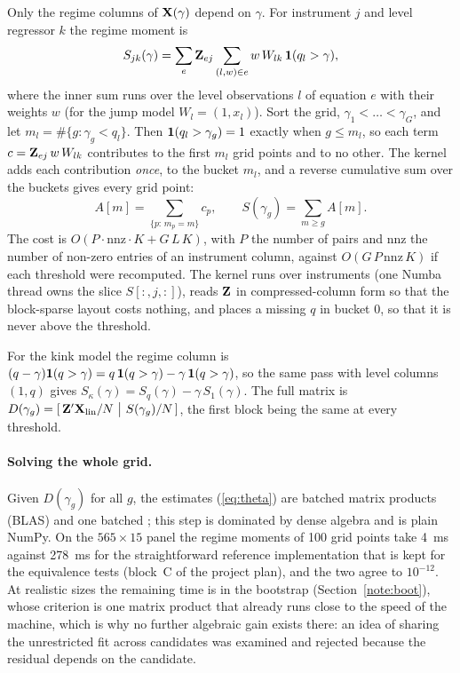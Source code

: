 \documentclass[
  10.5pt,
  a4paper,
]{article}
\begin{document}
Only the regime columns of $\mathbf{X}(\gamma)$ depend on $\gamma$. For instrument $j$ and level regressor
$k$ the regime moment is
\begin{equation}\label{eq:S}
S_{jk}(\gamma)=\sum_{e}\mathbf{Z}_{ej}\sum_{(l,w)\in e} w\,W_{lk}\,\mathbf{1}(q_l>\gamma),
\end{equation}
where the inner sum runs over the level observations $l$ of equation $e$ with their weights $w$
(for the jump model $W_l=(1,x_l)$). Sort the grid, $\gamma_1<\dots<\gamma_G$, and let
$m_l=\#\{g:\gamma_g<q_l\}$. Then $\mathbf{1}(q_l>\gamma_g)=1$ exactly when $g\le m_l$, so each term
$c=\mathbf{Z}_{ej}\,w\,W_{lk}$ contributes to the first $m_l$ grid points and to no other. The kernel adds
each contribution \emph{once}, to the bucket $m_l$, and a reverse cumulative sum over the buckets
gives every grid point:
\begin{equation}\label{eq:cumsum}
A[m]=\sum_{\{p:\,m_p=m\}}c_p,\qquad S(\gamma_g)=\sum_{m\ge g}A[m].
\end{equation}
The cost is $O(P\cdot\mathrm{nnz}\cdot K+G\,L\,K)$, with $P$ the number of pairs and $\mathrm{nnz}$
the number of non-zero entries of an instrument column, against $O(G\,P\,\mathrm{nnz}\,K)$ if each
threshold were recomputed. The kernel runs over instruments (one Numba thread owns the slice
$S[:,j,:]$), reads $\mathbf{Z}$ in compressed-column form so that the block-sparse layout costs nothing, and
places a missing $q$ in bucket 0, so that it is never above the threshold.

For the kink model the regime column is $(q-\gamma)\mathbf{1}(q>\gamma)=q\,\mathbf{1}(q>\gamma)-\gamma\,\mathbf{1}(q>\gamma)$,
so the same pass with level columns $(1,q)$ gives $S_\kappa(\gamma)=S_q(\gamma)-\gamma\,S_1(\gamma)$.
The full matrix is $D(\gamma_g)=[\,\bZ'\bX_{\text{lin}}/N\ \big|\ S(\gamma_g)/N\,]$, the first block
being the same at every threshold.

\paragraph{Solving the whole grid.} Given $D(\gamma_g)$ for all $g$, the estimates (\ref{eq:theta}) are
batched matrix products (BLAS) and one batched ; this step is dominated by dense algebra
and is plain NumPy. On the $565\times15$ panel the regime moments of 100 grid points take 4~ms
against 278~ms for the straightforward reference implementation that is kept for the equivalence
tests (block~C of the project plan), and the two agree to $10^{-12}$. At realistic sizes the
remaining time is in the bootstrap (Section~\ref{note:boot}), whose criterion is one matrix product
that already runs close to the speed of the machine, which is why no further algebraic gain exists
there: an idea of sharing the unrestricted fit across candidates was examined and rejected because the
residual depends on the candidate.
\end{document}
